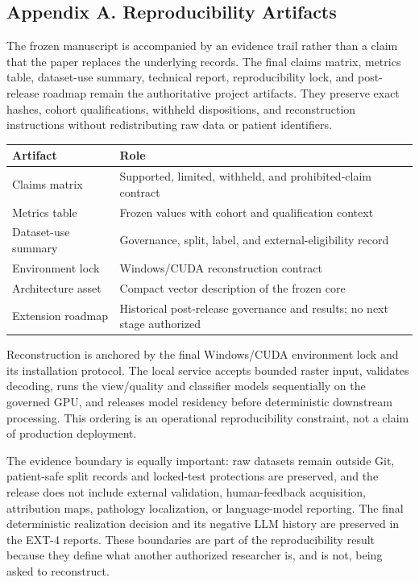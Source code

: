 \documentclass[10pt,a4paper,twocolumn]{article}
\begin{document}
\clearpage
\onecolumn
\begin{multicols}{2}
\begingroup\small


\endgroup

\section*{Appendix A. Reproducibility Artifacts}
\small
The frozen manuscript is accompanied by an evidence trail rather than a claim that the paper replaces the underlying records. The final claims matrix, metrics table, dataset-use summary, technical report, reproducibility lock, and post-release roadmap remain the authoritative project artifacts. They preserve exact hashes, cohort qualifications, withheld dispositions, and reconstruction instructions without redistributing raw data or patient identifiers.

\begin{center}\scriptsize
\begin{tabularx}{\columnwidth}{@{}l Y@{}}
\toprule
Artifact & Role\\
\midrule
Claims matrix & Supported, limited, withheld, and prohibited-claim contract\\
Metrics table & Frozen values with cohort and qualification context\\
Dataset-use summary & Governance, split, label, and external-eligibility record\\
Environment lock & Windows/CUDA reconstruction contract\\
Architecture asset & Compact vector description of the frozen core\\
Extension roadmap & Historical post-release governance and results; no next stage authorized\\
\bottomrule
\end{tabularx}
\end{center}
\vspace{3pt}
Reconstruction is anchored by the final Windows/CUDA environment lock and its installation protocol. The local service accepts bounded raster input, validates decoding, runs the view/quality and classifier models sequentially on the governed GPU, and releases model residency before deterministic downstream processing. This ordering is an operational reproducibility constraint, not a claim of production deployment.

The evidence boundary is equally important: raw datasets remain outside Git, patient-safe split records and locked-test protections are preserved, and the release does not include external validation, human-feedback acquisition, attribution maps, pathology localization, or language-model reporting. The final deterministic realization decision and its negative LLM history are preserved in the EXT-4 reports. These boundaries are part of the reproducibility result because they define what another authorized researcher is, and is not, being asked to reconstruct.
\end{multicols}
\end{document}
